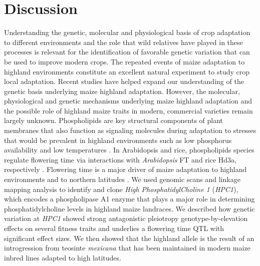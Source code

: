 \documentclass[9pt,twocolumn,twoside,lineno]{biorxiv}
\newcommand{\mex}{\textit{mexicana}\xspace}
\newcommand{\hpc}{\textit{HPC1}\xspace}
\begin{document}
 \section{Discussion}
\label{sec:discussion}
Understanding the genetic, molecular and  physiological basis of crop adaptation to different environments and the role that wild relatives have played in these processes is relevant for the identification of favorable genetic variation that can be used to improve modern crops.
The repeated events of maize adaptation to highland environments constitute an excellent natural experiment to study crop local adaptation. 
Recent studies \cite{Wang2020-mp, Takuno2015-uj, Crow2020-gene} have helped expand our understanding of the genetic basis underlying maize highland adaptation. 
However, the molecular, physiological and genetic mechanisms underlying maize highland adaptation and the possible role of highland maize traits in modern, commercial varieties remain largely unknown.
Phospholipids are key structural components of plant membranes that also function as signaling molecules during adaptation to stresses that would be prevalent in highland environments \cite{Ryu2004-iv, Nakamura2017-vb} such as low phosphorus availability \cite{Veneklaas2012-ls, Cruz-Ramirez2004-ib, Lambers2012-an} and low temperatures \cite{Degenkolbe2012-wf, Welti2002-uk, Marla2017-ph}. 
In Arabidopsis and rice, phospholipids species regulate flowering time via interactions with \textit{Arabidopsis} FT and rice Hd3a, respectively \cite{Nakamura2014-qf, Susila2021-dz, Qu2021-wc}. 
Flowering time is a major driver of maize adaptation to highland environments \cite{Romero_Navarro2017-cn, Gates2019-xu, Mercer2019-vj} and to northern latitudes \cite{Hung2012-ms, Swarts2017-ge}.
We used genomic scans and linkage mapping analysis to identify and clone \textit{High PhosphatidylCholine 1} (\hpc), which encodes a phospholipase A1 enzyme that plays a major role in determining phosphatidylcholine levels in highland maize landraces.
We described how genetic variation at \hpc showed strong antagonistic pleiotropy  genotype-by-elevation effects on several fitness traits and underlies a flowering time QTL with significant effect sizes.
We then showed that the highland allele is the result of an introgression from teosinte \mex that has been maintained in modern maize inbred lines adapted to high latitudes.
\end{document}
